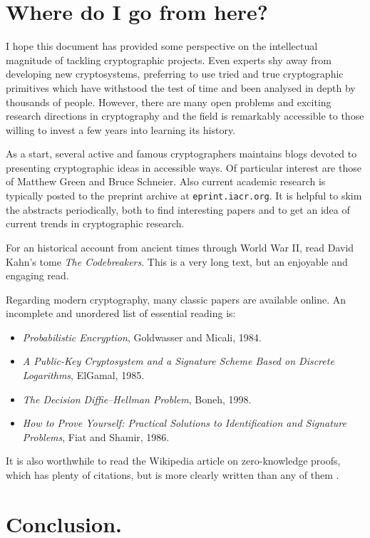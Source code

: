 \documentclass[letterpaper]{article}
\begin{document}
\section{Where do I go from here?}

I hope this document has provided some perspective on the intellectual
magnitude of tackling cryptographic projects. Even experts shy away from
developing new cryptosystems, preferring to use tried and true cryptographic
primitives which have withstood the test of time and been analysed in depth
by thousands of people. However, there are many open problems and exciting
research directions in cryptography and the field is remarkably accessible
to those willing to invest a few years into learning its history.

As a start, several active and famous cryptographers maintains blogs devoted
to presenting cryptographic ideas in accessible ways. Of particular interest
are those of Matthew Green and Bruce Schneier. Also current academic research
is typically posted to the preprint archive at \texttt{eprint.iacr.org}. It
is helpful to skim the abstracts periodically, both to find interesting papers
and to get an idea of current trends in cryptographic research.

For an historical account from ancient times through World War II, read
David Kahn's tome \emph{The Codebreakers}. This is a very long text, but an
enjoyable and engaging read.

Regarding modern cryptography, many classic papers are available online. An
incomplete and unordered list of essential reading is:
\begin{itemize}
\item \emph{Probabilistic Encryption}, Goldwasser and Micali, 1984.
\item \emph{A Public-Key Cryptosystem and a Signature Scheme Based on Discrete Logarithms}, ElGamal, 1985.
\item \emph{The Decision Diffie–Hellman Problem}, Boneh, 1998.
\item \emph{How to Prove Yourself: Practical Solutions to Identification and Signature Problems}, Fiat and Shamir, 1986.
\end{itemize}
It is also worthwhile to read the Wikipedia article on zero-knowledge proofs,
which has plenty of citations, but is more clearly written than any of them \smiley.

\section{Conclusion.}
\end{document}
